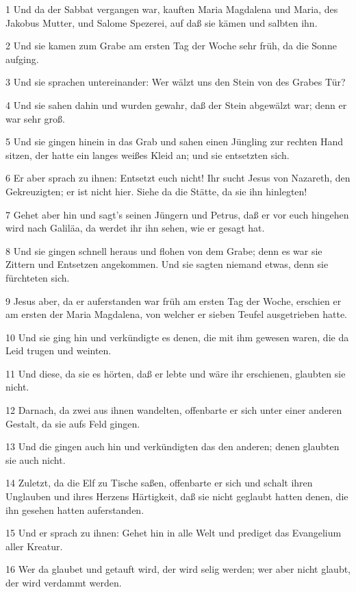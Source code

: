 \par 1 Und da der Sabbat vergangen war, kauften Maria Magdalena und Maria, des Jakobus Mutter, und Salome Spezerei, auf daß sie kämen und salbten ihn.
\par 2 Und sie kamen zum Grabe am ersten Tag der Woche sehr früh, da die Sonne aufging.
\par 3 Und sie sprachen untereinander: Wer wälzt uns den Stein von des Grabes Tür?
\par 4 Und sie sahen dahin und wurden gewahr, daß der Stein abgewälzt war; denn er war sehr groß.
\par 5 Und sie gingen hinein in das Grab und sahen einen Jüngling zur rechten Hand sitzen, der hatte ein langes weißes Kleid an; und sie entsetzten sich.
\par 6 Er aber sprach zu ihnen: Entsetzt euch nicht! Ihr sucht Jesus von Nazareth, den Gekreuzigten; er ist nicht hier. Siehe da die Stätte, da sie ihn hinlegten!
\par 7 Gehet aber hin und sagt's seinen Jüngern und Petrus, daß er vor euch hingehen wird nach Galiläa, da werdet ihr ihn sehen, wie er gesagt hat.
\par 8 Und sie gingen schnell heraus und flohen von dem Grabe; denn es war sie Zittern und Entsetzen angekommen. Und sie sagten niemand etwas, denn sie fürchteten sich.
\par 9 Jesus aber, da er auferstanden war früh am ersten Tag der Woche, erschien er am ersten der Maria Magdalena, von welcher er sieben Teufel ausgetrieben hatte.
\par 10 Und sie ging hin und verkündigte es denen, die mit ihm gewesen waren, die da Leid trugen und weinten.
\par 11 Und diese, da sie es hörten, daß er lebte und wäre ihr erschienen, glaubten sie nicht.
\par 12 Darnach, da zwei aus ihnen wandelten, offenbarte er sich unter einer anderen Gestalt, da sie aufs Feld gingen.
\par 13 Und die gingen auch hin und verkündigten das den anderen; denen glaubten sie auch nicht.
\par 14 Zuletzt, da die Elf zu Tische saßen, offenbarte er sich und schalt ihren Unglauben und ihres Herzens Härtigkeit, daß sie nicht geglaubt hatten denen, die ihn gesehen hatten auferstanden.
\par 15 Und er sprach zu ihnen: Gehet hin in alle Welt und prediget das Evangelium aller Kreatur.
\par 16 Wer da glaubet und getauft wird, der wird selig werden; wer aber nicht glaubt, der wird verdammt werden.
